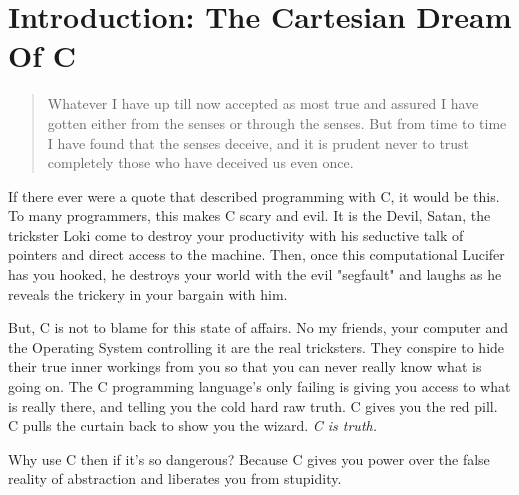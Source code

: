 \chapter{Introduction: The Cartesian Dream Of C}

\begin{quotation}

Whatever I have up till now accepted as most true and assured I have gotten
either from the senses or through the senses. But from time to time I have
found that the senses deceive, and it is prudent never to trust completely
those who have deceived us even once.

\end{quotation}

If there ever were a quote that described programming with C, it would be this.
To many programmers, this makes C scary and evil.  It is the Devil, Satan, the
trickster Loki come to destroy your productivity with his seductive talk of
pointers and direct access to the machine.  Then, once this computational
Lucifer has you hooked, he destroys your world with the evil "segfault" and
laughs as he reveals the trickery in your bargain with him.

But, C is not to blame for this state of affairs.  No my friends, your computer
and the Operating System controlling it are the real tricksters.  They conspire
to hide their true inner workings from you so that you can never really know
what is going on.  The C programming language's only failing is giving you
access to what is really there, and telling you the cold hard raw truth.  C
gives you the red pill.  C pulls the curtain back to show you the wizard.
\emph{C is truth.}

Why use C then if it's so dangerous?   Because C gives you power over the false
reality of abstraction and liberates you from stupidity.


